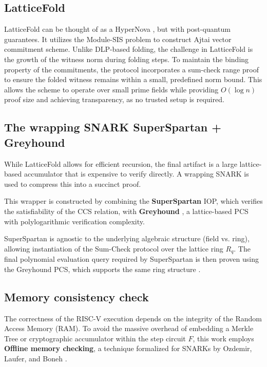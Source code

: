 \subsection{LatticeFold}

LatticeFold \cite{LatticeFold} can be thought of as a HyperNova \cite{HyperNova},
but with post-quantum guarantees. It utilizes the Module-SIS \cite{MSIS}
problem to construct Ajtai vector commitment scheme. Unlike DLP-based folding,
the challenge in LatticeFold is the growth of the witness norm during folding
steps. To maintain the binding property of the commitments, the protocol
incorporates a sum-check range proof to ensure the folded witness remains
within a small, predefined norm bound. This allows the scheme to operate
over small prime fields while providing $O(\log n)$ proof size and achieving
transparency, as no trusted setup is required.

\subsection{The wrapping SNARK SuperSpartan + Greyhound}\label{subsec:wrapping_snark}

While LatticeFold allows for efficient recursion, the final artifact is a
large lattice-based accumulator that is expensive to verify directly.
A wrapping SNARK is used to compress this into a succinct proof.

This wrapper is constructed by combining the \textbf{SuperSpartan} \cite{Spartan, HyperNova}
IOP, which verifies the satisfiability of the CCS relation, with
\textbf{Greyhound} \cite{Greyhound}, a lattice-based PCS with polylogarithmic
verification complexity.

SuperSpartan is agnostic to the underlying algebraic structure (field vs. ring),
allowing instantiation of the Sum-Check protocol \cite{SumcheckArticle} over the lattice
ring $R_q$. The final polynomial evaluation query required by SuperSpartan is
then proven using the Greyhound PCS, which supports the same ring structure \cite{HyperNova, Greyhound}.

\subsection{Memory consistency check}\label{subsec:memory_check}

The correctness of the RISC-V execution depends on the integrity of the
Random Access Memory (RAM). To avoid the massive overhead of embedding a
Merkle Tree or cryptographic accumulator within the step circuit $F$, this
work employs \textbf{Offline memory checking}, a technique formalized for
SNARKs by Ozdemir, Laufer, and Boneh \cite{MemoryAccessInSnarks}.

